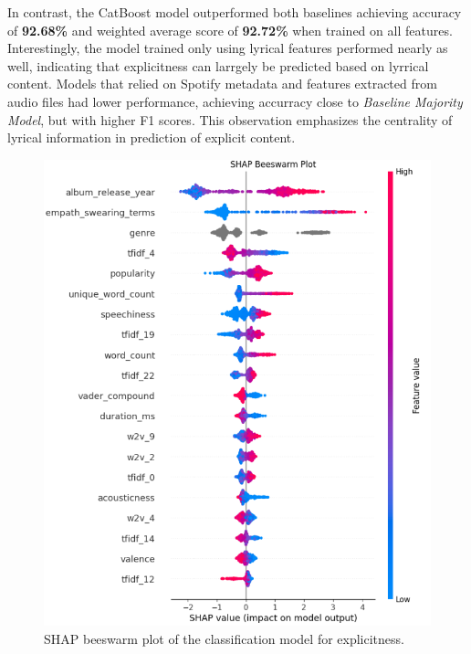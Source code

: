 In contrast, the CatBoost model outperformed both baselines achieving accuracy
of \textbf{92.68\%} and weighted average score of \textbf{92.72\%} when trained
on all features. Interestingly, the model trained only using lyrical features
performed nearly as well, indicating that explicitness can larrgely be
predicted based on lyrrical content. Models that relied on Spotify metadata and
features extracted from audio files had lower performance, achieving accurracy
close to \textit{Baseline Majority Model}, but with higher F1 scores. This
observation emphasizes the centrality of lyrical information in prediction of
explicit content.


\begin{center}
\begin{figure}[H]
  \centering
  \includegraphics[width=5in]{img/beeswarm_explicitness.png}
  \caption{SHAP beeswarm plot of the classification model for explicitness.}
  \label{Figure:fig_beh}
\end{figure}
\end{center}

